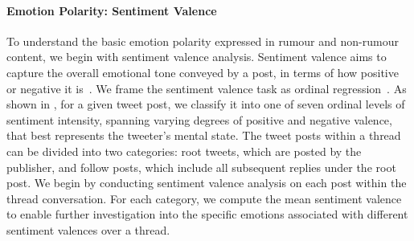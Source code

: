 \paragraph{Emotion Polarity: Sentiment Valence} 
To understand the basic emotion polarity expressed in rumour and non-rumour content, we begin with sentiment valence analysis. Sentiment valence aims to capture the overall emotional tone conveyed by a post, in terms of how positive or negative it is~\citep{liu2024emosurvey}. We frame the sentiment valence task as ordinal regression~\citep{mohammad-etal-2018-semeval}. As shown in , for a given tweet post, we classify it into one of seven ordinal levels of sentiment intensity, spanning varying degrees of positive and negative valence, that best represents the tweeter's mental state. The tweet posts within a thread can be divided into two categories: root tweets, which are posted by the publisher, and follow posts, which include all subsequent replies under the root post. We begin by conducting sentiment valence analysis on each post within the thread conversation. 
For each category, we compute the mean sentiment valence to enable further investigation into the specific emotions associated with different sentiment valences over a thread.

